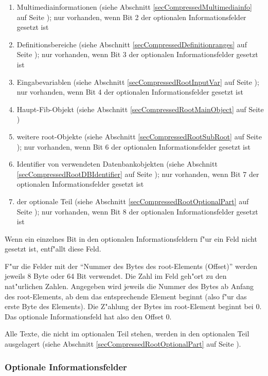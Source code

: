 \begin{enumerate}
 \item Multimediainformationen (siehe Abschnitt \ref{secCompressedMultimediainfo} auf Seite \pageref{secCompressedMultimediainfo}); nur vorhanden, wenn Bit 2 der optionalen Informationsfelder gesetzt ist
 \item Definitionsbereiche (siehe Abschnitt \ref{secCompressedDefinitionranges} auf Seite \pageref{secCompressedDefinitionranges}); nur vorhanden, wenn Bit 3 der optionalen Informationsfelder gesetzt ist
 \item Eingabevariablen (siehe Abschnitt \ref{secCompressedRootInputVar} auf Seite \pageref{secCompressedRootInputVar}); nur vorhanden, wenn Bit 4 der optionalen Informationsfelder gesetzt ist
 \item Haupt-Fib-Objekt (siehe Abschnitt \ref{secCompressedRootMainObject} auf Seite \pageref{secCompressedRootMainObject})
 \item weitere root-Objekte (siehe Abschnitt \ref{secCompressedRootSubRoot} auf Seite \pageref{secCompressedRootSubRoot}); nur vorhanden, wenn Bit 6 der optionalen Informationsfelder gesetzt ist
 \item Identifier von verwendeten Datenbankobjekten (siehe Abschnitt \ref{secCompressedRootDBIdentifier} auf Seite \pageref{secCompressedRootDBIdentifier}); nur vorhanden, wenn Bit 7 der optionalen Informationsfelder gesetzt ist
\item der optionale Teil (siehe Abschnitt \ref{secCompressedRootOptionalPart} auf Seite \pageref{secCompressedRootOptionalPart}); nur vorhanden, wenn Bit 8 der optionalen Informationsfelder gesetzt ist
\end{enumerate}

Wenn ein einzelnes Bit in den optionalen Informationsfeldern f"ur ein Feld nicht gesetzt ist, entf"allt diese Feld.

F"ur die Felder mit der ``Nummer des Bytes des root-Elements (Offset)'' werden jeweils 8 Byte oder 64 Bit verwendet. Die Zahl im Feld geh"ort zu den nat"urlichen Zahlen. Angegeben wird jeweils die Nummer des Bytes ab Anfang des root-Elements, ab dem das entsprechende Element beginnt (also f"ur das erste Byte des Elements). Die Z"ahlung der Bytes im root-Element beginnt bei 0. Das optionale Informationsfeld hat also den Offset 0.

Alle Texte, die nicht im optionalen Teil stehen, werden in den optionalen Teil ausgelagert (siehe Abschnitt \ref{secCompressedRootOptionalPart} auf Seite \pageref{secCompressedRootOptionalPart}).


\subsubsection{Optionale Informationsfelder}
\label{secCompressedOptionlInfos}

